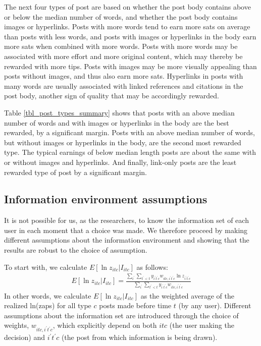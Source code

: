 The next four types of post are based on whether the post body contains above or below the median number of words, and whether the post body contains images or hyperlinks. Posts with more words tend to earn more sats on average than posts with less words, and posts with images or hyperlinks in the body earn more sats when combined with more words. Posts with more words may be associated with more effort and more original content, which may thereby be rewarded with more tips. Posts with images may be more visually appealing than posts without images, and thus also earn more sats. Hyperlinks in posts with many words are usually associated with linked references and citations in the post body, another sign of quality that may be accordingly rewarded. 

Table \ref{tbl_post_types_summary} shows that posts with an above median number of words and with images or hyperlinks in the body are the best rewarded, by a significant margin. Posts with an above median number of words, but without images or hyperlinks in the body, are the second most rewarded type. The typical earnings of below median length posts are about the same with or without images and hyperlinks. And finally, link-only posts are the least rewarded type of post by a significant margin.




\subsection{Information environment assumptions}

It is not possible for us, as the researchers, to know the information set of each user in each moment that a choice was made. We therefore proceed by making different assumptions about the information environment and showing that the results are robust to the choice of assumption.

To start with, we calculate $E\left[ \ln z_{itc} | I_{itc} \right]$ as follows:
\begin{align}
E\left[ \ln z_{itc} | I_{itc} \right] = \frac{\sum_{i^\prime} \sum_{t^\prime < t} y_{i^\prime t^\prime c} w_{itc,i^\prime t^\prime c} \ln z_{i^\prime t^\prime c} }{\sum_{i^\prime} \sum_{t^\prime < t} y_{i^\prime t^\prime c} w_{itc, i^\prime t^\prime c}}
\end{align}
In other words, we calculate $E\left[ \ln z_{itc} | I_{itc} \right]$ as the weighted average of the realized ln(zaps) for all type $c$ posts made before time $t$ (by any user). Different assumptions about the information set are introduced through the choice of weights, $w_{itc,i^\prime t^\prime c}$, which explicitly depend on both $itc$ (the user making the decision) and $i^\prime t^\prime c$ (the post from which information is being drawn). 

